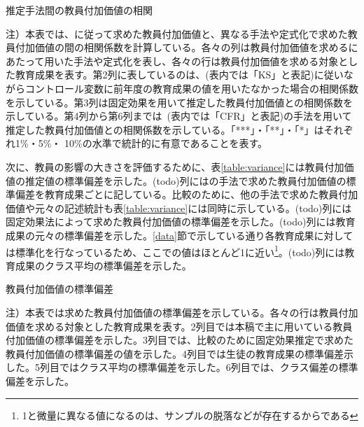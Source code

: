 \documentclass[a4paper,12pt]{article}
\begin{document}
\begin{table}[htbp]
\begin{adjustbox}{max width=1.5\textwidth}

\end{adjustbox}
\caption{推定手法間の教員付加価値の相関}
\label{table:robust}
\begin{flushleft}
\footnotesize{
注）本表では、\cite{kane2008estimating}に従って求めた教員付加価値と、異なる手法や定式化で求めた教員付加価値の間の相関係数を計算している。各々の列は教員付加価値を求めるにあたって用いた手法や定式化を表し、各々の行は教員付加価値を求める対象とした教育成果を表す。第2列に表しているのは、\cite{kane2008estimating}(表内では「KS」と表記)に従いながらコントロール変数に前年度の教育成果の値を用いたなかった場合の相関係数を示している。第3列は固定効果を用いて推定した教員付加価値との相関係数を示している。第4列から第6列までは \cite{chetty2014measuring}(表内では「CFR」と表記)の手法を用いて推定した教員付加価値との相関係数を示している。「***」・「**」・「*」はそれぞれ1\%・5\%・ 10\%の水準で統計的に有意であることを表す。
}
\end{flushleft}
\end{table}


次に、教員の影響の大きさを評価するために、表\ref{table:variance}には教員付加価値の推定値の標準偏差を示した。(todo)列には\cite{kane2008estimating}の手法で求めた教員付加価値の標準偏差を教育成果ごとに記している。比較のために、他の手法で求めた教員付加価値や元々の記述統計も表\ref{table:variance}には同時に示している。(todo)列には固定効果法によって求めた教員付加価値の標準偏差を示した。(todo)列には教育成果の元々の標準偏差を示した。\ref{data}節で示している通り各教育成果に対しては標準化を行なっているため、ここでの値はほとんど1に近い\footnote{1と微量に異なる値になるのは、サンプルの脱落などが存在するからである}。(todo)列には教育成果のクラス平均の標準偏差を示した。


\begin{table}[htbp]
\begin{adjustbox}{max width=1\textwidth}

\end{adjustbox}
\caption{教員付加価値の標準偏差}
\label{table:variance}
\begin{flushleft}
\footnotesize{
注）本表では求めた教員付加価値の標準偏差を示している。各々の行は教員付加価値を求める対象とした教育成果を表す。2列目では本稿で主に用いている教員付加価値の標準偏差を示した。3列目では、比較のために固定効果推定で求めた教員付加価値の標準偏差の値を示した。4列目では生徒の教育成果の標準偏差示した。5列目ではクラス平均の標準偏差を示した。6列目では、クラス偏差の標準偏差を示した。
}
\end{flushleft}
\end{table}
\end{document}
